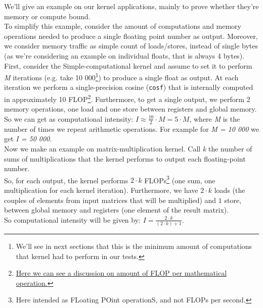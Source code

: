 	We'll give an example on our kernel applications, mainly to prove whether they're memory or compute bound.\\
	To simplify this example, consider the amount of computations and memory operations needed to produce a single floating point number as output.
	Moreover, we consider memory traffic as simple count of loads/stores, instead of single bytes (as we're considering an example on individual floats, that is always 4 bytes).\\
	First, consider the Simple-computational kernel and assume to set it to perform \textit{M} iterations (e.g. take 10 000\footnote{We'll see in next sections that this is the minimum amount of computations that kernel had to perform in our tests.}) to produce a single float as output. At each iteration we perform a single-precision cosine (\texttt{cosf}) that is internally computed in approximately 10 FLOP\footnote{\href{https://devtalk.nvidia.com/default/topic/983983/how-to-calculate-the-total-number-of-fop-and-floating-point-performance-of-special-operations-exp-sin-sqrt-/}{Here we can see a discussion on amount of FLOP per mathematical operation.}}. Furthermore, to get a single output, we perform 2 memory operations, one load and one store between registers and global memory.\\
	So we can get as computational intensity: \(I \approx \frac{10}{2} \cdot M = 5 \cdot M \), where \textit{M} is the number of times we repeat arithmetic operations. For example for \textit{M = 10 000} we get \textit{I = 50 000}.\\
	
	Now we make an example on matrix-multiplication kernel.
	Call \textit{k} the number of sums of multiplications that the kernel performs to output each floating-point number.\\
	So, for each output, the kernel performs \(2 \cdot k\) FLOPs\footnote{Here intended as FLoating POint operationS, and not FLOPs per second.} (one sum, one multiplication for each kernel iteration).
	Furthermore, we have \(2 \cdot k\) loads (the couples of elements from input matrices that will be multiplied) and \(1\) store, between global memory and registers (one element of the result matrix).\\
	So computational intensity will be given by: \(I = \frac{2 \cdot k}{(2 \cdot k) + 1} \).\\
	
